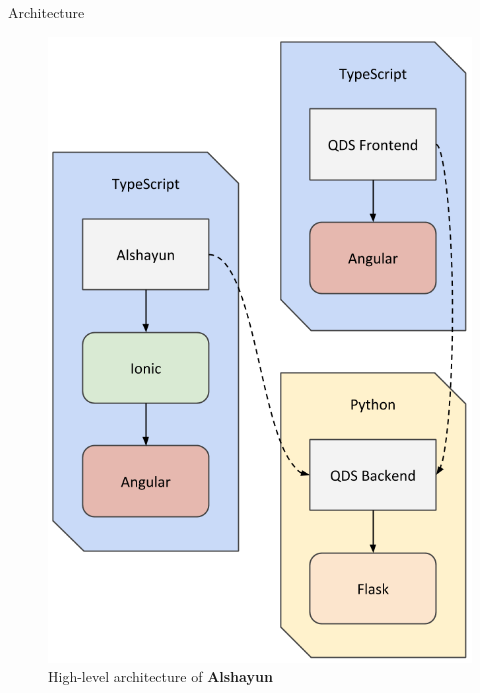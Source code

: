\documentclass{beamer}
\begin{document}
\begin{frame}{Architecture}
    \begin{figure}
        \begin{center}
            \includegraphics[scale=0.2]{images/arch.png}
        \end{center}
        \caption{High-level architecture of \textbf{Alshayun}}
    \end{figure}
\end{frame}
\end{document}
